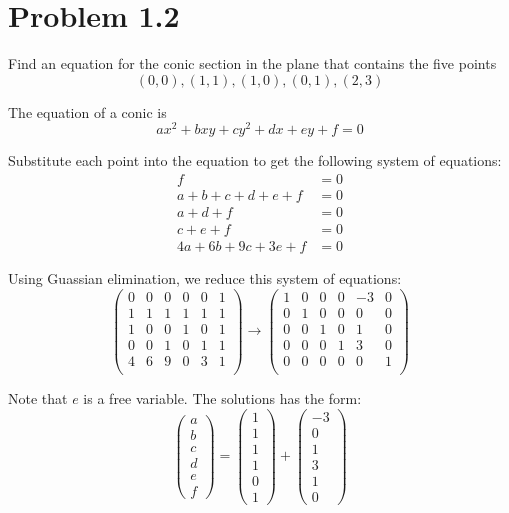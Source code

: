 \section*{Problem 1.2}

Find an equation for the conic section in the plane that contains the five
points 
\[ (0, 0), (1, 1), (1, 0), (0, 1), (2, 3) \]

The equation of a conic is 
\[ ax^2 + bxy + cy^2 + dx + ey + f = 0 \]

Substitute each point into the equation to get the following system of
equations:
\begin{align*}
  f &= 0 \\
  a + b + c + d + e + f &= 0 \\
  a + d + f &= 0 \\
  c + e + f &= 0 \\
  4a + 6b + 9c + 3e + f &= 0
\end{align*}

Using Guassian elimination, we reduce this system of equations:
\[
  \begin{pmatrix}
    0 & 0 & 0 & 0 & 0 & 1 \\
    1 & 1 & 1 & 1 & 1 & 1 \\
    1 & 0 & 0 & 1 & 0 & 1 \\
    0 & 0 & 1 & 0 & 1 & 1 \\
    4 & 6 & 9 & 0 & 3 & 1 \\
  \end{pmatrix}
  \rightarrow
  \begin{pmatrix}
    1 & 0 & 0 & 0 & -3 & 0 \\
    0 & 1 & 0 & 0 & 0 & 0 \\
    0 & 0 & 1 & 0 & 1 & 0 \\
    0 & 0 & 0 & 1 & 3 & 0 \\
    0 & 0 & 0 & 0 & 0 & 1 \\ 
  \end{pmatrix}
\]

Note that $e$ is a free variable. The solutions has the form:
\[
 \begin{pmatrix} a \\ b \\ c \\ d \\ e \\ f \end{pmatrix} 
 =
 \begin{pmatrix} 1 \\ 1 \\ 1 \\ 1 \\ 0 \\ 1 \end{pmatrix}
 +
 \begin{pmatrix} -3 \\ 0 \\ 1 \\ 3 \\ 1 \\ 0 \end{pmatrix}
\]

